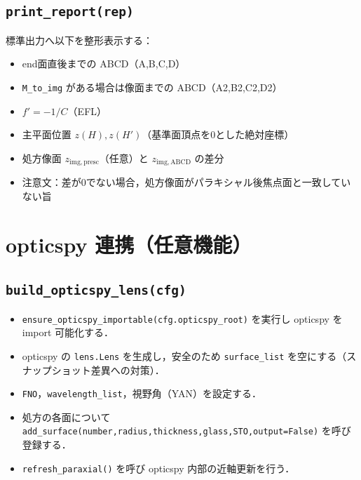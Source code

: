 \documentclass[a4paper,11pt]{jsarticle} %
\begin{document}
\subsection{\texttt{print\_report(rep)}}
標準出力へ以下を整形表示する：
\begin{itemize}
  \item end面直後までの ABCD（A,B,C,D）
  \item \texttt{M\_to\_img} がある場合は像面までの ABCD（A2,B2,C2,D2）
  \item $f'=-1/C$（EFL）
  \item 主平面位置 $z(H), z(H')$（基準面頂点を0とした絶対座標）
  \item 処方像面 $z_{\mathrm{img,presc}}$（任意）と $z_{\mathrm{img,ABCD}}$ の差分
  \item 注意文：差が0でない場合，処方像面がパラキシャル後焦点面と一致していない旨
\end{itemize}

\section{opticspy 連携（任意機能）}
\subsection{\texttt{build\_opticspy\_lens(cfg)}}
\begin{itemize}
  \item \texttt{ensure\_opticspy\_importable(cfg.opticspy\_root)} を実行し opticspy を import 可能化する．
  \item opticspy の \texttt{lens.Lens} を生成し，安全のため \texttt{surface\_list} を空にする（スナップショット差異への対策）．
  \item \texttt{FNO}，\texttt{wavelength\_list}，視野角（YAN）を設定する．
  \item 処方の各面について \texttt{add\_surface(number,radius,thickness,glass,STO,output=False)} を呼び登録する．
  \item \texttt{refresh\_paraxial()} を呼び opticspy 内部の近軸更新を行う．
\end{itemize}
\end{document}
